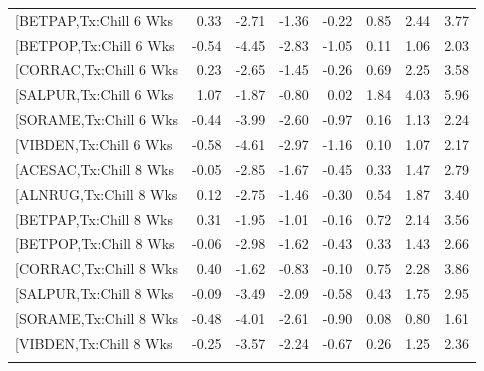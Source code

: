 \documentclass{article}\usepackage[]{graphicx}\usepackage[]{color}
\begin{document}
\begin{longtable}{lrrrrrrr}
  [BETPAP,Tx:Chill 6 Wks & 0.33 & -2.71 & -1.36 & -0.22 & 0.85 & 2.44 & 3.77 \\ 
  [BETPOP,Tx:Chill 6 Wks & -0.54 & -4.45 & -2.83 & -1.05 & 0.11 & 1.06 & 2.03 \\ 
  [CORRAC,Tx:Chill 6 Wks & 0.23 & -2.65 & -1.45 & -0.26 & 0.69 & 2.25 & 3.58 \\ 
  [SALPUR,Tx:Chill 6 Wks & 1.07 & -1.87 & -0.80 & 0.02 & 1.84 & 4.03 & 5.96 \\ 
  [SORAME,Tx:Chill 6 Wks & -0.44 & -3.99 & -2.60 & -0.97 & 0.16 & 1.13 & 2.24 \\ 
  [VIBDEN,Tx:Chill 6 Wks & -0.58 & -4.61 & -2.97 & -1.16 & 0.10 & 1.07 & 2.17 \\ 
  [ACESAC,Tx:Chill 8 Wks & -0.05 & -2.85 & -1.67 & -0.45 & 0.33 & 1.47 & 2.79 \\ 
  [ALNRUG,Tx:Chill 8 Wks & 0.12 & -2.75 & -1.46 & -0.30 & 0.54 & 1.87 & 3.40 \\ 
  [BETPAP,Tx:Chill 8 Wks & 0.31 & -1.95 & -1.01 & -0.16 & 0.72 & 2.14 & 3.56 \\ 
  [BETPOP,Tx:Chill 8 Wks & -0.06 & -2.98 & -1.62 & -0.43 & 0.33 & 1.43 & 2.66 \\ 
  [CORRAC,Tx:Chill 8 Wks & 0.40 & -1.62 & -0.83 & -0.10 & 0.75 & 2.28 & 3.86 \\ 
  [SALPUR,Tx:Chill 8 Wks & -0.09 & -3.49 & -2.09 & -0.58 & 0.43 & 1.75 & 2.95 \\ 
  [SORAME,Tx:Chill 8 Wks & -0.48 & -4.01 & -2.61 & -0.90 & 0.08 & 0.80 & 1.61 \\ 
  [VIBDEN,Tx:Chill 8 Wks & -0.25 & -3.57 & -2.24 & -0.67 & 0.26 & 1.25 & 2.36 \\ 
   \hline
\hline
\label{tab:suppmoddvr}
\end{longtable}
\end{document}
